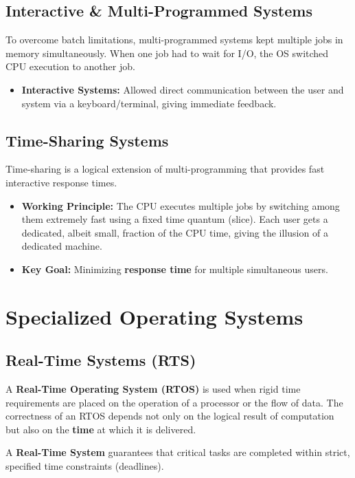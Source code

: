 \documentclass[12pt,a4paper]{article}
\begin{document}
\subsection{Interactive \& Multi-Programmed Systems}
To overcome batch limitations, multi-programmed systems kept multiple jobs in memory simultaneously. When one job had to wait for I/O, the OS switched CPU execution to another job.
\begin{itemize}[leftmargin=*, itemsep=3pt]
  \item \textbf{Interactive Systems:} Allowed direct communication between the user and system via a keyboard/terminal, giving immediate feedback.
\end{itemize}

\subsection{Time-Sharing Systems}
Time-sharing is a logical extension of multi-programming that provides fast interactive response times.
\begin{itemize}[leftmargin=*, itemsep=3pt]
  \item \textbf{Working Principle:} The CPU executes multiple jobs by switching among them extremely fast using a fixed time quantum (slice). Each user gets a dedicated, albeit small, fraction of the CPU time, giving the illusion of a dedicated machine.
  \item \textbf{Key Goal:} Minimizing \textbf{response time} for multiple simultaneous users.
\end{itemize}

\section{Specialized Operating Systems}

\subsection{Real-Time Systems (RTS)}
A \textbf{Real-Time Operating System (RTOS)} is used when rigid time requirements are placed on the operation of a processor or the flow of data. The correctness of an RTOS depends not only on the logical result of computation but also on the \textbf{time} at which it is delivered.

\begin{tcolorbox}[defbox, title={\textbf{Definition: Real-Time Systems}}]
A \textbf{Real-Time System} guarantees that critical tasks are completed within strict, specified time constraints (deadlines).
\end{tcolorbox}
\end{document}
